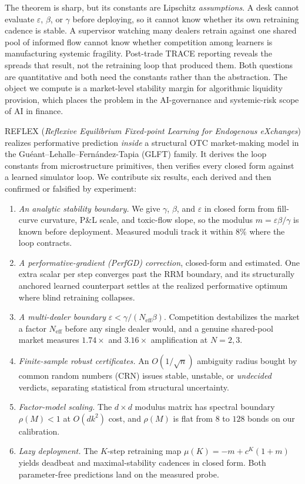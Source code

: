 \documentclass[sigconf]{acmart}
\newcommand{\eps}{\varepsilon}
\newcommand{\Neff}{N_{\mathrm{eff}}}
\begin{document}
The theorem is sharp, but its constants are Lipschitz \emph{assumptions}. A
desk cannot evaluate $\eps$, $\beta$, or $\gamma$ before deploying, so it
cannot know whether its own retraining cadence is stable. A supervisor
watching many dealers retrain against one shared pool of informed flow
cannot know whether competition among learners is manufacturing systemic
fragility. Post-trade TRACE reporting reveals the spreads that result, not
the retraining loop that produced them. Both questions are quantitative and
both need the constants rather than the abstraction. The object we compute
is a market-level stability margin for algorithmic liquidity provision,
which places the problem in the AI-governance and systemic-risk scope of AI
in finance.

REFLEX (\emph{Reflexive Equilibrium Fixed-point Learning for Endogenous
eXchanges}) realizes performative prediction \emph{inside} a structural OTC
market-making model
in the Gu\'eant--Lehalle--Fern\'andez-Tapia (GLFT) family. It derives the
loop constants from microstructure primitives, then verifies every closed
form against a learned simulator loop. We contribute six results, each
derived and then confirmed or falsified by experiment:
\begin{enumerate}
\item[\textbf{R1}] \emph{An analytic stability boundary.} We give $\gamma$,
  $\beta$, and $\eps$ in closed form from fill-curve curvature, P\&L scale,
  and toxic-flow slope, so the modulus $m=\eps\beta/\gamma$ is known before
  deployment. Measured moduli track it within $8\%$ where the loop
  contracts.
\item[\textbf{R2}] \emph{A performative-gradient (PerfGD) correction},
  closed-form and estimated. One extra scalar per step converges past the
  RRM boundary, and its structurally anchored learned counterpart settles at
  the realized performative optimum where blind retraining collapses.
\item[\textbf{R3}] \emph{A multi-dealer boundary} $\eps<\gamma/(\Neff\beta)$.
  Competition destabilizes the market a factor $\Neff$ before any single
  dealer would, and a genuine shared-pool market measures $1.74\times$ and
  $3.16\times$ amplification at $N=2,3$.
\item[\textbf{R4}] \emph{Finite-sample robust certificates.} An
  $O(1/\sqrt{n})$ ambiguity radius bought by common random numbers (CRN)
  issues stable, unstable, or \emph{undecided} verdicts, separating
  statistical from structural uncertainty.
\item[\textbf{R5}] \emph{Factor-model scaling.} The $d{\times}d$ modulus
  matrix has spectral boundary $\rho(M)<1$ at $O(dk^2)$ cost, and
  $\rho(M)$ is flat from $8$ to $128$ bonds on our calibration.
\item[\textbf{R6}] \emph{Lazy deployment.} The $K$-step retraining map
  $\mu(K)=-m+c^K(1+m)$ yields deadbeat and maximal-stability cadences in
  closed form. Both parameter-free predictions land on the measured probe.
\end{enumerate}
\end{document}
